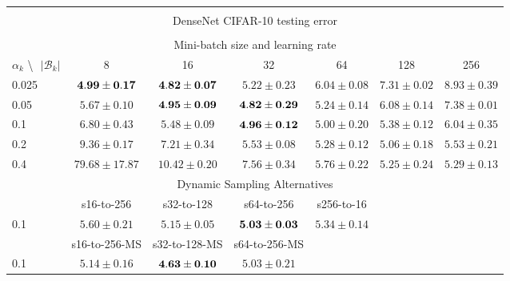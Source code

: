 \documentclass[10pt,journal,compsoc]{IEEEtran}
\begin{document}
\begin{table*}[!htbp]
\begin{center}
{\begin{tabular}{|l|c|c|c|c|c|c|}
\multicolumn{7}{|c|}{} \\
\multicolumn{7}{|c|}{DenseNet CIFAR-10 testing error} \\
\multicolumn{7}{|c|}{} \\
\hline
\multicolumn{7}{|c|}{Mini-batch size and learning rate} \\
\hline
$\alpha_k$ \textbackslash $ \text{   } {|\mathcal{B}_k|}$ & 8 & 16 & 32 & 64 & 128 & 256\\
\hline
0.025 &  $\bf 4.99\pm0.17$ & $\bf 4.82\pm0.07$ & $5.22\pm0.23$ & $6.04\pm0.08$ & $7.31\pm0.02$ & $8.93\pm0.39$  \\
\hline
0.05  & $5.67\pm0.10$ & $\bf 4.95\pm0.09$ & $\bf 4.82\pm0.29$ & $5.24\pm0.14$ & $6.08\pm0.14$ & $7.38\pm0.01$ \\
\hline
0.1   & $6.80\pm0.43$ & $5.48\pm0.09$ & $\bf 4.96\pm0.12$ & $5.00\pm0.20$ & $5.38\pm0.12$ & $6.04\pm0.35$  \\
\hline
0.2   & $9.36\pm0.17$ & $7.21\pm0.34$ & $5.53\pm0.08$ & $5.28\pm0.12$ & $5.06\pm0.18$ & $5.53\pm0.21$  \\
\hline
0.4   & $79.68\pm17.87$ & $10.42\pm0.20$ & $7.56\pm0.34$ & $5.76\pm0.22$ & $5.25\pm0.24$ & $5.29\pm0.13$  \\
\hline
\multicolumn{7}{|c|}{Dynamic Sampling Alternatives}\\
\hline
& s16-to-256  & s32-to-128 & s64-to-256 & s256-to-16 & & \\
\hline
0.1   & $5.60\pm0.21$ & $5.15\pm0.05$ & $\bf 5.03\pm0.03$ & $5.34\pm0.14$ & & \\
\hline
& s16-to-256-MS & s32-to-128-MS & s64-to-256-MS & 
& & \\
\hline
0.1 & $5.14\pm0.16$ & $\bf 4.63\pm0.10$ & $5.03\pm0.21$ & 
& & \\
\hline
\end{tabular}}
\end{center}
\end{table*}


\end{document}
